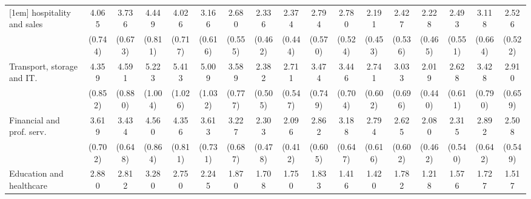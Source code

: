 {\begin{tabular}{l*{16}{c}}
[1em]
hospitality and sales&       4.065\sym{***}&       3.736\sym{***}&       4.449\sym{***}&       4.026\sym{***}&       3.166\sym{***}&       2.680\sym{***}&       2.336\sym{***}&       2.374\sym{***}&       2.794\sym{***}&       2.780\sym{***}&       2.191\sym{***}&       2.427\sym{***}&       2.228\sym{***}&       2.493\sym{***}&       3.118\sym{***}&       2.526\sym{***}\\
                    &     (0.744)         &     (0.673)         &     (0.811)         &     (0.717)         &     (0.616)         &     (0.555)         &     (0.462)         &     (0.444)         &     (0.570)         &     (0.524)         &     (0.453)         &     (0.536)         &     (0.465)         &     (0.551)         &     (0.664)         &     (0.522)         \\
[1em]
Transport, storage and IT.&       4.359\sym{***}&       4.591\sym{***}&       5.223\sym{***}&       5.413\sym{***}&       5.009\sym{***}&       3.589\sym{***}&       2.382\sym{***}&       2.711\sym{***}&       3.474\sym{***}&       3.446\sym{***}&       2.741\sym{***}&       3.033\sym{***}&       2.019\sym{**} &       2.628\sym{***}&       3.428\sym{***}&       2.910\sym{***}\\
                    &     (0.852)         &     (0.880)         &     (1.004)         &     (1.026)         &     (1.032)         &     (0.777)         &     (0.505)         &     (0.547)         &     (0.749)         &     (0.704)         &     (0.602)         &     (0.696)         &     (0.440)         &     (0.611)         &     (0.790)         &     (0.659)         \\
[1em]
Financial and prof. serv.&       3.619\sym{***}&       3.434\sym{***}&       4.560\sym{***}&       4.356\sym{***}&       3.613\sym{***}&       3.227\sym{***}&       2.303\sym{***}&       2.096\sym{***}&       2.862\sym{***}&       3.188\sym{***}&       2.794\sym{***}&       2.625\sym{***}&       2.080\sym{***}&       2.315\sym{***}&       2.892\sym{***}&       2.508\sym{***}\\
                    &     (0.702)         &     (0.648)         &     (0.864)         &     (0.811)         &     (0.731)         &     (0.687)         &     (0.478)         &     (0.412)         &     (0.605)         &     (0.647)         &     (0.616)         &     (0.602)         &     (0.462)         &     (0.540)         &     (0.642)         &     (0.549)         \\
[1em]
Education and healthcare&       2.880\sym{***}&       2.812\sym{***}&       3.280\sym{***}&       2.750\sym{***}&       2.245\sym{***}&       1.870\sym{**} &       1.708\sym{*}  &       1.750\sym{**} &       1.833\sym{**} &       1.416         &       1.420         &       1.782\sym{*}  &       1.218         &       1.576         &       1.727\sym{*}  &       1.517         \\

\end{tabular}}
